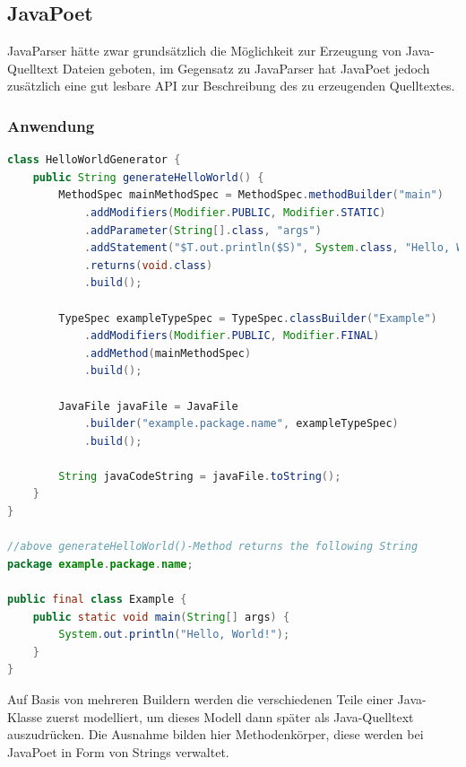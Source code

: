 \documentclass[12pt,oneside,a4paper,parskip]{scrbook}
\begin{document}
\newpage
\subsection{JavaPoet}

JavaParser hätte zwar grundsätzlich die Möglichkeit zur Erzeugung von Java-Quelltext Dateien geboten, im Gegensatz zu JavaParser hat JavaPoet jedoch zusätzlich eine gut lesbare API zur Beschreibung des zu erzeugenden Quelltextes.

\subsubsection{Anwendung}

\begin{lstlisting}[label=lst:jpoet,
language=java,
firstnumber=1,
caption={Java-Quelltext zur Erzeugung eines \glqq Hallo, Welt!\grqq -Beispiels, angelehnt an das \glqq Hello, JavaPoet!\grqq{} Beispiel in der README.md von\,\cite{javapoet2017}.}]
class HelloWorldGenerator {
	public String generateHelloWorld() {
		MethodSpec mainMethodSpec = MethodSpec.methodBuilder("main")
			.addModifiers(Modifier.PUBLIC, Modifier.STATIC)
			.addParameter(String[].class, "args")
			.addStatement("$T.out.println($S)", System.class, "Hello, World!")
			.returns(void.class)
			.build();

		TypeSpec exampleTypeSpec = TypeSpec.classBuilder("Example")
			.addModifiers(Modifier.PUBLIC, Modifier.FINAL)
			.addMethod(mainMethodSpec)
			.build();
		
		JavaFile javaFile = JavaFile
			.builder("example.package.name", exampleTypeSpec)
			.build();

		String javaCodeString = javaFile.toString();
	}
}

//above generateHelloWorld()-Method returns the following String
package example.package.name;

public final class Example {
	public static void main(String[] args) {
		System.out.println("Hello, World!");
	}
}

\end{lstlisting}

Auf Basis von mehreren Buildern werden die verschiedenen Teile einer Java-Klasse zuerst modelliert, um dieses Modell dann später als Java-Quelltext auszudrücken. Die Ausnahme bilden hier Methodenkörper, diese werden bei JavaPoet in Form von Strings verwaltet.
\end{document}
